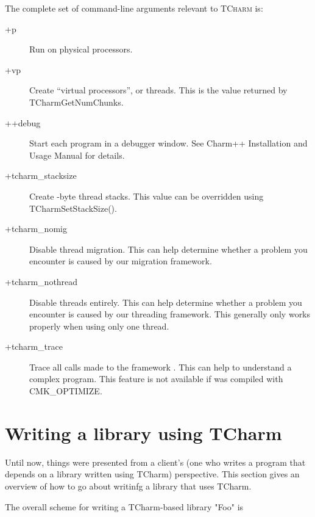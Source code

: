 \documentclass[10pt]{article}
\newcommand{\tcharm}{\textsc{TCharm}}
\begin{document}
The complete set of command-line arguments relevant to \tcharm{} is:

\begin{description}
\item[+p ] Run on  physical processors.

\item[+vp ] Create  ``virtual processors'', or threads.  This is
the value returned by TCharmGetNumChunks.

\item[++debug] Start each program in a debugger window.  See Charm++
Installation and Usage Manual for details.

\item[+tcharm\_stacksize ] Create -byte thread stacks.  This
value can be overridden using TCharmSetStackSize().

\item[+tcharm\_nomig] Disable thread migration.  This can help determine
whether a problem you encounter is caused by our migration framework.

\item[+tcharm\_nothread] Disable threads entirely.  This can help determine
whether a problem you encounter is caused by our threading framework.
This generally only works properly when using only one thread.

\item[+tcharm\_trace ] Trace all calls made to the framework .
This can help to understand a complex program.  This feature is not
available if \charmpp{} was compiled with CMK\_OPTIMIZE.

\end{description}

\section{Writing a library using TCharm}
\label{sec:tlib}

Until now, things were presented from a client's (one who writes a program that
depends on a library written using TCharm) perspective. This section gives an
overview of how to go about writinfg a library that uses TCharm.

The overall scheme for writing a TCharm-based library "Foo" is
\end{document}
